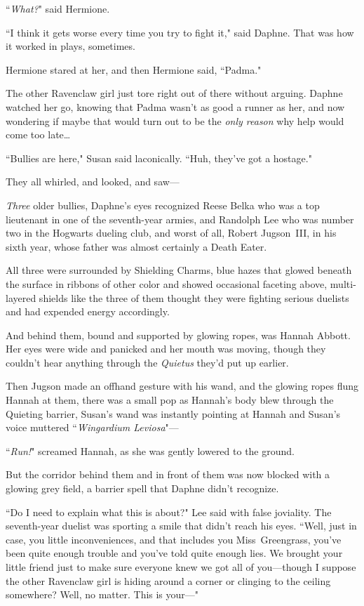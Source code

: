 ``\emph{What?}" said Hermione.

``I think it gets worse every time you try to fight it," said Daphne. That was how it worked in plays, sometimes.

Hermione stared at her, and then Hermione said, ``Padma."

The other Ravenclaw girl just tore right out of there without arguing. Daphne watched her go, knowing that Padma wasn't as good a runner as her, and now wondering if maybe that would turn out to be the \emph{only reason} why help would come too late{\ldots}

``Bullies are here," Susan said laconically. ``Huh, they've got a hostage."

They all whirled, and looked, and saw—

\emph{Three} older bullies, Daphne's eyes recognized Reese Belka who was a top lieutenant in one of the seventh-year armies, and Randolph Lee who was number two in the Hogwarts dueling club, and worst of all, Robert Jugson~III, in his sixth year, whose father was almost certainly a Death Eater.

All three were surrounded by Shielding Charms, blue hazes that glowed beneath the surface in ribbons of other color and showed occasional faceting above, multi-layered shields like the three of them thought they were fighting serious duelists and had expended energy accordingly.

And behind them, bound and supported by glowing ropes, was Hannah Abbott. Her eyes were wide and panicked and her mouth was moving, though they couldn't hear anything through the \emph{Quietus} they'd put up earlier.

Then Jugson made an offhand gesture with his wand, and the glowing ropes flung Hannah at them, there was a small pop as Hannah's body blew through the Quieting barrier, Susan's wand was instantly pointing at Hannah and Susan's voice muttered ``\emph{Wingardium Leviosa}"—

``\emph{Run!}" screamed Hannah, as she was gently lowered to the ground.

But the corridor behind them and in front of them was now blocked with a glowing grey field, a barrier spell that Daphne didn't recognize.

``Do I need to explain what this is about?" Lee said with false joviality. The seventh-year duelist was sporting a smile that didn't reach his eyes. ``Well, just in case, you little inconveniences, and that includes you Miss~Greengrass, you've been quite enough trouble and you've told quite enough lies. We brought your little friend just to make sure everyone knew we got all of you—though I suppose the other Ravenclaw girl is hiding around a corner or clinging to the ceiling somewhere? Well, no matter. This is your—"

